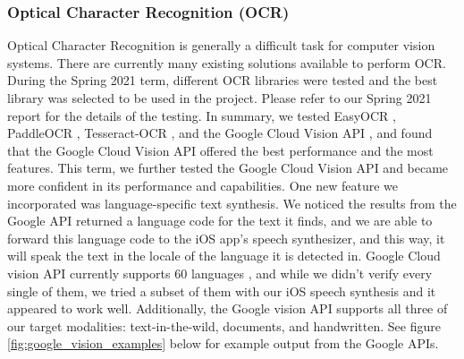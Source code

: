 \documentclass[a4paper,11pt]{article}
\begin{document}
\subsubsection{Optical Character Recognition (OCR)}
Optical Character Recognition is generally a difficult task for computer vision systems. There are currently many existing solutions available to perform OCR. During the Spring 2021 term, different OCR libraries were tested and the best library was selected to be used in the project. Please refer to our Spring 2021 report for the details of the testing. In summary, we tested EasyOCR \cite{easy-ocr}, PaddleOCR \cite{paddle-ocr}, Tesseract-OCR \cite{tesseract-github}, and the Google Cloud Vision API \cite{google-vision-api}, and found that the Google Cloud Vision API offered the best performance and the most features. This term, we further tested the Google Cloud Vision API and became more confident in its performance and capabilities. One new feature we incorporated was language-specific text synthesis. We noticed the results from the Google API returned a language code for the text it finds, and we are able to forward this language code to the iOS app's speech synthesizer, and this way, it will speak the text in the locale of the language it is detected in. Google Cloud vision API currently supports 60 languages \cite{google-languages}, and while we didn't verify every single of them, we tried a subset of them with our iOS speech synthesis and it appeared to work well. Additionally, the Google vision API supports all three of our target modalities: text-in-the-wild, documents, and handwritten. See figure \ref{fig:google_vision_examples} below for example output from the Google APIs.
\end{document}

